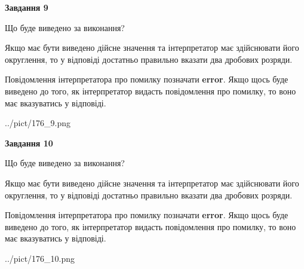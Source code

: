 \documentclass[12pt, ukrainian]{article}
\begin{document}
{\begin {Large}
{\begin {center}\textbf{Завдання 9}\end {center}}\par
Що буде виведено за виконання? \par

Якщо має бути виведено дійсне значення та інтерпретатор має здійснювати його округлення, 
то у відповіді достатньо правильно вказати два дробових розряди.

Повідомлення інтерпретатора про помилку позначати \textbf{error}.
Якщо щось буде виведено до того, як інтерпретатор видасть повідомлення про помилку, 
то воно має вказуватись у відповіді. \par

\begin{center}
	{../pict/176_9.png}
\end{center}
\newpage

{\begin {center}\textbf{Завдання 10}\end {center}}\par
Що буде виведено за виконання? \par

Якщо має бути виведено дійсне значення та інтерпретатор має здійснювати його округлення, 
то у відповіді достатньо правильно вказати два дробових розряди.

Повідомлення інтерпретатора про помилку позначати \textbf{error}.
Якщо щось буде виведено до того, як інтерпретатор видасть повідомлення про помилку, 
то воно має вказуватись у відповіді. \par

\begin{center}
	{../pict/176_10.png}
\end{center}
\newpage

\end {Large}}
\end{document}
